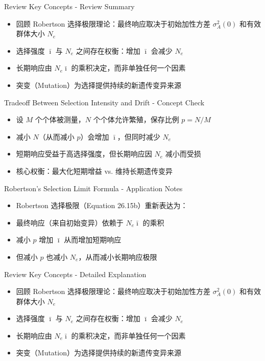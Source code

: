 \documentclass[10pt, aspectratio=169]{ctexbeamer}
\begin{document}
\begin{frame}{Review Key Concepts - Review Summary}
  \begin{itemize}
    \item 回顾 Robertson 选择极限理论：最终响应取决于初始加性方差 $\sigma_A^2(0)$ 和有效群体大小 $N_e$
    \item 选择强度 $\bar{\imath}$ 与 $N_e$ 之间存在权衡：增加 $\bar{\imath}$ 会减少 $N_e$
    \item 长期响应由 $N_e \bar{\imath}$ 的乘积决定，而非单独任何一个因素
    \item 突变（Mutation）为选择提供持续的新遗传变异来源
  \end{itemize}
\end{frame}

\begin{frame}{Tradeoff Between Selection Intensity and Drift - Concept Check}
  \begin{itemize}
    \item 设 $M$ 个个体被测量，$N$ 个个体允许繁殖，保存比例 $p = N/M$
    \item 减小 $N$（从而减小 $p$）会增加 $\bar{\imath}$，但同时减少 $N_e$
    \item 短期响应受益于高选择强度，但长期响应因 $N_e$ 减小而受损
    \item 核心权衡：最大化短期增益 vs. 维持长期遗传变异
  \end{itemize}
\end{frame}

\begin{frame}{Robertson's Selection Limit Formula - Application Notes}
  \begin{itemize}
    \item Robertson 选择极限（Equation 26.15b）重新表达为：
    \item 最终响应（来自初始变异）依赖于 $N_e \bar{\imath}$ 的乘积
    \item 减小 $p$ 增加 $\bar{\imath}$ 从而增加短期响应
    \item 但减小 $p$ 也减小 $N_e$，从而减小长期响应极限
  \end{itemize}
\end{frame}

\begin{frame}{Review Key Concepts - Detailed Explanation}
  \begin{itemize}
    \item 回顾 Robertson 选择极限理论：最终响应取决于初始加性方差 $\sigma_A^2(0)$ 和有效群体大小 $N_e$
    \item 选择强度 $\bar{\imath}$ 与 $N_e$ 之间存在权衡：增加 $\bar{\imath}$ 会减少 $N_e$
    \item 长期响应由 $N_e \bar{\imath}$ 的乘积决定，而非单独任何一个因素
    \item 突变（Mutation）为选择提供持续的新遗传变异来源
  \end{itemize}
\end{frame}
\end{document}
